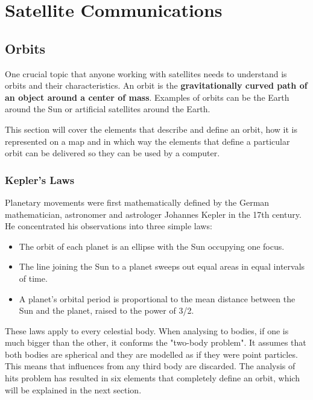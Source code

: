 

\chapter{Satellite Communications}



\section{Orbits}\label{2.1}
One crucial topic that anyone working with satellites needs to understand is orbits and their characteristics. An orbit is the \textbf{gravitationally curved path of an object around a center of mass}. Examples of orbits can be the Earth around the Sun or artificial satellites around the Earth.

This section will cover the elements that describe and define an orbit, how it is represented on a map and in which way the elements that define a particular orbit can be delivered so they can be used by a computer.


\subsection{Kepler's Laws}\label{2.1}
Planetary movements were first mathematically defined by the German mathematician, astronomer and astrologer Johannes Kepler in the 17th century. He concentrated his observations into three simple laws\citep{SSEng}:
\begin{itemize}

\item The orbit of each planet is an ellipse with the Sun occupying one focus.
\item The line joining the Sun to a planet sweeps out equal areas in equal intervals of time.
\item A planet's orbital period is proportional to the mean distance between the Sun and the planet, raised to the power of 3/2.
\end{itemize} 

These laws apply to every celestial body. When analysing to bodies, if one is much bigger than the other, it conforms the "two-body problem". It assumes that both bodies are spherical and they are modelled as if they were point particles. This means that influences from any third body are discarded. The analysis of hits problem has resulted in six elements that completely define an orbit, which will be explained in the next section.


